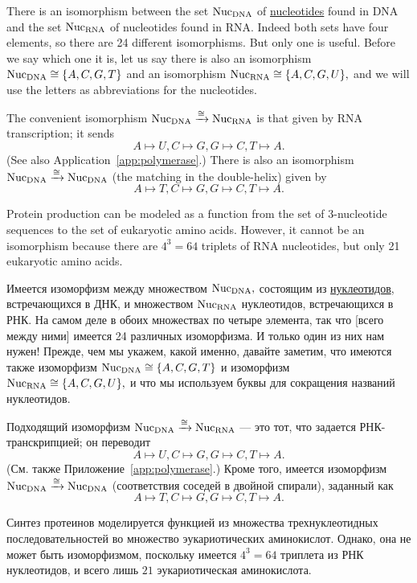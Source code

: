 \documentclass[CT4S-EN-RU]{subfiles}
\begin{document}
\begin{applicationENG}\label{app:DNA RNA}
There is an isomorphism between the set $\textnormal{Nuc}_\textnormal{DNA}$ of \href{http://en.wikipedia.org/wiki/Nucleotides}{\text nucleotides} found in DNA and the set $\textnormal{Nuc}_\textnormal{RNA}$ of nucleotides found in RNA. Indeed both sets have four elements, so there are 24 different isomorphisms. But only one is useful. Before we say which one it is, let us say there is also an isomorphism $\textnormal{Nuc}_\textnormal{DNA}\cong\{A,C,G,T\}$ and an isomorphism $\textnormal{Nuc}_\textnormal{RNA}\cong\{A,C,G,U\},$ and we will use the letters as abbreviations for the nucleotides. 

The convenient isomorphism $\textnormal{Nuc}_\textnormal{DNA}\xrightarrow{\cong}\textnormal{Nuc}_\textnormal{RNA}$ is that given by RNA transcription; it sends 
$$A\mapsto U, C\mapsto G, G\mapsto C, T\mapsto A.$$ 
(See also Application~\ref{app:polymerase}.) There is also an isomorphism $\textnormal{Nuc}_\textnormal{DNA}\xrightarrow{\cong}\textnormal{Nuc}_\textnormal{DNA}$ (the matching in the double-helix) given by 
$$A\mapsto T, C\mapsto G, G\mapsto C, T\mapsto A.$$

Protein production can be modeled as a function from the set of 3-nucleotide sequences to the set of eukaryotic amino acids. However, it cannot be an isomorphism because there are $4^3=64$ triplets of RNA nucleotides, but only 21 eukaryotic amino acids. 
\end{applicationENG}

\begin{applicationRUS}\label{app:DNA RNA}
Имеется изоморфизм между множеством $\textnormal{Nuc}_\textnormal{DNA},$ состоящим из  \href{https://ru.wikipedia.org/wiki/%D0%9D%D1%83%D0%BA%D0%BB%D0%B5%D0%BE%D1%82%D0%B8%D0%B4%D1%8B}{\text нуклеотидов}, встречающихся в ДНК, и множеством $\textnormal{Nuc}_\textnormal{RNA}$ нуклеотидов, встречающихся в РНК. На самом деле в обоих множествах по четыре элемента, так что [всего между ними] имеется 24 различных изоморфизма. И только один из них нам нужен! Прежде, чем мы укажем, какой именно, давайте заметим, что имеются также изоморфизм $\textnormal{Nuc}_\textnormal{DNA}\cong\{A,C,G,T\}$ и изоморфизм $\textnormal{Nuc}_\textnormal{RNA}\cong\{A,C,G,U\},$ и что мы используем буквы для сокращения названий нуклеотидов. 

Подходящий изоморфизм $\textnormal{Nuc}_\textnormal{DNA}\xrightarrow{\cong}\textnormal{Nuc}_\textnormal{RNA}$ — это тот, что задается РНК-транскрипцией; он переводит
$$A\mapsto U, C\mapsto G, G\mapsto C, T\mapsto A.$$ 
(См. также Приложение~\ref{app:polymerase}.) Кроме того, имеется изоморфизм $\textnormal{Nuc}_\textnormal{DNA}\xrightarrow{\cong}\textnormal{Nuc}_\textnormal{DNA}$ (соответствия соседей в двойной спирали), заданный как  
$$A\mapsto T, C\mapsto G, G\mapsto C, T\mapsto A.$$

Синтез протеинов моделируется функцией из множества трехнуклеотидных последовательностей во множество эукариотических аминокислот. Однако, она не может быть изоморфизмом, поскольку имеется $4^3=64$ триплета из РНК нуклеотидов, и всего лишь $21$ эукариотическая аминокислота. 
\end{applicationRUS}
\end{document}
